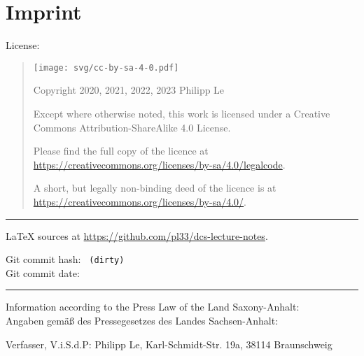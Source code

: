 %
%
%

\chapter*{Imprint}

{
\small

License:

\begin{quote}
	\texttt{[image: svg/cc-by-sa-4-0.pdf]}
		
	Copyright \textcopyright{} 2020, 2021, 2022, 2023 Philipp Le
	
	Except where otherwise noted, this work is licensed under a
	Creative Commons Attribution-ShareAlike 4.0 License.
	
	Please find the full copy of the licence at \url{https://creativecommons.org/licenses/by-sa/4.0/legalcode}.
	
	A short, but legally non-binding deed of the licence is at \url{https://creativecommons.org/licenses/by-sa/4.0/}.
\end{quote}

\vspace{1.5em}

\hrule{}

\vspace{1.5em}

\LaTeX{} sources at \url{https://github.com/pl33/dcs-lecture-notes}.

Git commit hash: \texttt{\VcsCommitHashLong{} \ifdefined\VcsIsClean \else (dirty) \fi}\\
Git commit date: \texttt{\VcsCommitTime}

\vspace{1.5em}

\hrule{}

\vspace{1.5em}

Information according to the Press Law of the Land Saxony-Anhalt:\\
Angaben gem\"a{}{\ss} des Pressegesetzes des Landes Sachsen-Anhalt:

Verfasser, V.i.S.d.P: Philipp Le, Karl-Schmidt-Str. 19a, 38114 Braunschweig

}

